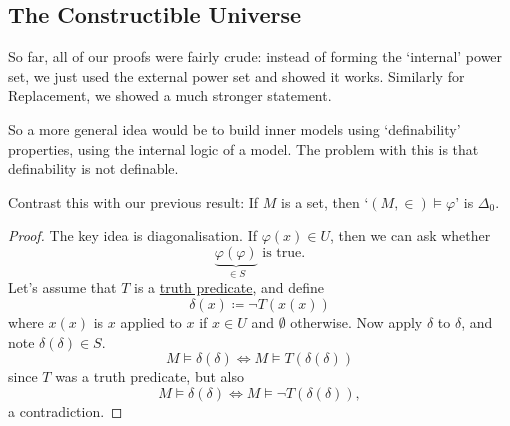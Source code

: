 \documentclass{article}
\newcommand{\named}[1]{\textbf{#1}\index{#1}}
\newcommand{\1}{\mathbbm{1}}
\let\models\vDash
\begin{document}
\subsection{The Constructible Universe}
So far, all of our proofs were fairly crude: instead of forming the `internal' power set, we just used the external power set and showed it works.
Similarly for Replacement, we showed a much stronger statement.

So a more general idea would be to build inner models using `definability' properties, using the internal logic of a model.
The problem with this is that definability is not definable.
Contrast this with our previous result:
  If $M$ is a set, then `$(M,\in) \models \varphi$' is \hyperlink{def:delta0}{$\Delta_0$}.
\begin{proof}
  The key idea is diagonalisation.
  If $\varphi(x) \in U$, then we can ask whether
  \begin{equation*}
    \underbrace{\varphi(\varphi)}_{\in S}\text{ is true.}
  \end{equation*}
  Let's assume that $T$ is a \hyperlink{def:truthpred}{truth predicate}, and define
  \begin{equation*}\delta(x) \coloneqq \neg T(x(x))\end{equation*}
  where $x(x)$ is $x$ applied to $x$ if $x \in U$ and $\emptyset$ otherwise.
  Now apply $\delta$ to $\delta$, and note $ \delta(\delta) \in S $.
  \begin{equation*}
    M \models \delta(\delta) \iff M \models T(\delta(\delta))
  \end{equation*}
  since $T$ was a truth predicate, but also
  \begin{equation*}
    M \models \delta(\delta) \iff M \models \neg T(\delta(\delta)),
  \end{equation*}
  a contradiction.
\end{proof}
\end{document}

